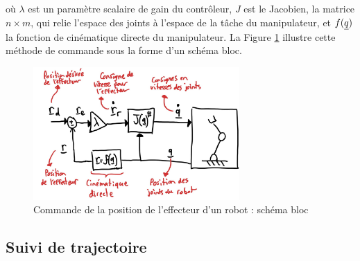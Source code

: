 où $\lambda$ est un paramètre scalaire de gain du contrôleur, $J$ est le Jacobien, la matrice $n \times m$, qui relie l'espace des joints à l'espace de la tâche du manipulateur, et $f(\underline{q})$ la fonction de cinématique directe du manipulateur. La Figure \ref{fig:robotspeedcontrolpos} illustre cette méthode de commande sous la forme d'un schéma bloc.
\begin{figure}[H]
	\centering
	\includegraphics[width=0.7\textwidth]{fig/robotspeedcontrolpos.jpg}
	\caption{Commande de la position de l'effecteur d'un robot : schéma bloc}
	\label{fig:robotspeedcontrolpos}
\end{figure}










\subsection{Suivi de trajectoire}
\label{sec:trajcontrol}

